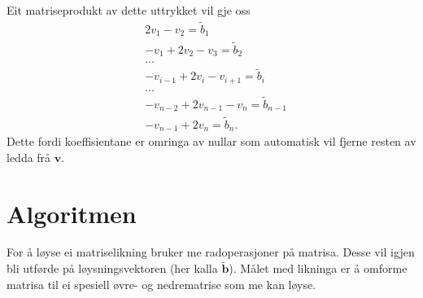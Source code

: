 \documentclass[11pt, a4paper]{article}
\begin{document}
  Eit matriseprodukt av dette uttrykket vil gje oss
  \begin{equation*}
    \begin{align}
      &2v_1 - v_2 = \tilde{b}_1 \\
      &-v_1 + 2v_2 - v_3 = \tilde{b}_2 \\
      &\dots \\
      &-v_{i-1} + 2v_i - v_{i+1} = \tilde{b}_i \\
      &\dots \\
      &-v_{n-2} + 2v_{n-1} -v_{n} = \tilde{b}_{n-1} \\
      &-v_{n-1} + 2v_{n} = \tilde{b}_n.
    \end{align}
  \end{equation*}
  Dette fordi koeffisientane er omringa av nullar som automatisk vil fjerne resten av ledda frå 
  $\mathbf{v}$.

\section{Algoritmen}
  For å løyse ei matriselikning bruker me radoperasjoner på matrisa. Desse vil igjen bli utførde på
  løysningsvektoren (her kalla $\mathbf{\tilde{b}}$). Målet med likninga er å omforme matrisa til ei 
  spesiell øvre-  og nedrematrise som me kan løyse. 
  
\end{document}
